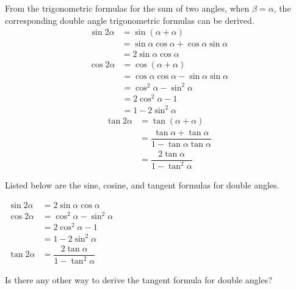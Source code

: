 \documentclass{report}
\begin{document}
From the trigonometric formulas for the sum of two angles, when $\beta=\alpha$, the corresponding double angle trigonometric formulas can be derived.
\begin{align*}
	\sin 2 \alpha & =\sin (\alpha+\alpha)                            \\
	              & =\sin \alpha \cos \alpha+\cos \alpha \sin \alpha \\
	              & =2 \sin \alpha \cos \alpha                       
\end{align*}
\begin{align*}
	\cos 2 \alpha & =\cos (\alpha+\alpha)                            \\
	              & =\cos \alpha \cos \alpha-\sin \alpha \sin \alpha \\
	              & =\cos ^2 \alpha-\sin ^2 \alpha                   \\
	              & =2 \cos ^2 \alpha-1                              \\
	              & =1-2 \sin ^2 \alpha                              
\end{align*}
\begin{align*}
	\tan 2 \alpha & =\tan (\alpha+\alpha)                                       \\
	              & =\dfrac{\tan \alpha+\tan \alpha}{1-\tan \alpha \tan \alpha} \\
	              & =\dfrac{2 \tan \alpha}{1-\tan ^2 \alpha}                    
\end{align*}

Listed below are the sine, cosine, and tangent formulas for double angles.
\begin{info}
	    
	$\begin{aligned} \sin 2 \alpha & =2 \sin \alpha \cos \alpha \\ \cos 2 \alpha & =\cos ^2 \alpha-\sin ^2 \alpha \\ & =2 \cos ^2 \alpha-1 \\ & =1-2 \sin ^2 \alpha \\ \tan 2 \alpha & =\dfrac{2 \tan \alpha}{1-\tan ^2 \alpha}\end{aligned}$
\end{info}

\begin{think}
	        
	\noindent Is there any other way to derive the tangent formula for double angles?
\end{think}
\end{document}
